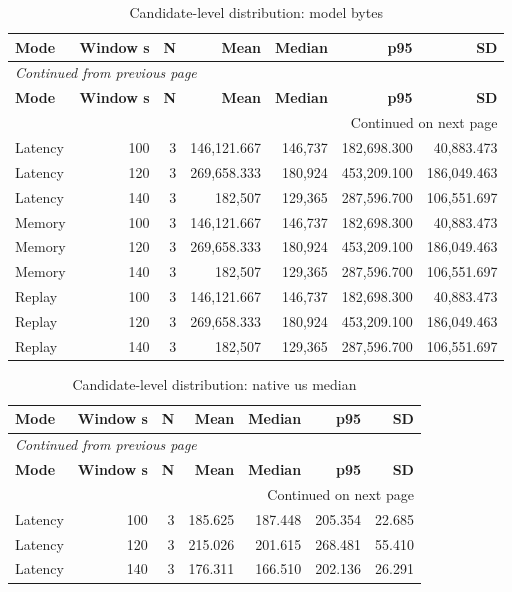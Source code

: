 \documentclass[10pt,a4paper]{article}
\begin{document}
\begingroup\small\setlength{\tabcolsep}{4pt}\renewcommand{\arraystretch}{1.12}
\begin{longtable}{@{}lrrrrrr@{}}
\caption{Candidate-level distribution:\allowbreak{} model bytes}\\
\toprule
\textbf{Mode} & \textbf{Window s} & \textbf{N} & \textbf{Mean} & \textbf{Median} & \textbf{p95} & \textbf{SD} \\
\midrule\endfirsthead
\multicolumn{7}{l}{\small\itshape Continued from previous page}\\
\toprule
\textbf{Mode} & \textbf{Window s} & \textbf{N} & \textbf{Mean} & \textbf{Median} & \textbf{p95} & \textbf{SD} \\
\midrule\endhead
\midrule\multicolumn{7}{r}{\small Continued on next page}\\\endfoot
\bottomrule\endlastfoot
Latency & 100 & 3 & 146,121.667 & 146,737 & 182,698.300 & 40,883.473 \\
Latency & 120 & 3 & 269,658.333 & 180,924 & 453,209.100 & 186,049.463 \\
Latency & 140 & 3 & 182,507 & 129,365 & 287,596.700 & 106,551.697 \\
Memory & 100 & 3 & 146,121.667 & 146,737 & 182,698.300 & 40,883.473 \\
Memory & 120 & 3 & 269,658.333 & 180,924 & 453,209.100 & 186,049.463 \\
Memory & 140 & 3 & 182,507 & 129,365 & 287,596.700 & 106,551.697 \\
Replay & 100 & 3 & 146,121.667 & 146,737 & 182,698.300 & 40,883.473 \\
Replay & 120 & 3 & 269,658.333 & 180,924 & 453,209.100 & 186,049.463 \\
Replay & 140 & 3 & 182,507 & 129,365 & 287,596.700 & 106,551.697 \\
\end{longtable}\endgroup
\begingroup\small\setlength{\tabcolsep}{4pt}\renewcommand{\arraystretch}{1.12}
\begin{longtable}{@{}lrrrrrr@{}}
\caption{Candidate-level distribution:\allowbreak{} native us median}\\
\toprule
\textbf{Mode} & \textbf{Window s} & \textbf{N} & \textbf{Mean} & \textbf{Median} & \textbf{p95} & \textbf{SD} \\
\midrule\endfirsthead
\multicolumn{7}{l}{\small\itshape Continued from previous page}\\
\toprule
\textbf{Mode} & \textbf{Window s} & \textbf{N} & \textbf{Mean} & \textbf{Median} & \textbf{p95} & \textbf{SD} \\
\midrule\endhead
\midrule\multicolumn{7}{r}{\small Continued on next page}\\\endfoot
\bottomrule\endlastfoot
Latency & 100 & 3 & 185.625 & 187.448 & 205.354 & 22.685 \\
Latency & 120 & 3 & 215.026 & 201.615 & 268.481 & 55.410 \\
Latency & 140 & 3 & 176.311 & 166.510 & 202.136 & 26.291 \\
\end{longtable}\endgroup
\end{document}
